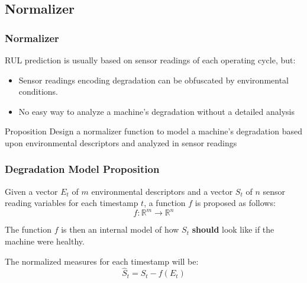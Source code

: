 \documentclass{beamer}
\begin{document}
        \subsection{Normalizer}

            \begin{frame}
                \frametitle{Normalizer}
                RUL prediction is usually based on sensor readings of each operating cycle, but:
                \begin{itemize}
                    \item Sensor readings encoding degradation can be obfuscated by environmental conditions.
                    \item No easy way to analyze a machine's degradation without a detailed analysis
                \end{itemize}
                \begin{block}{Proposition}
                    Design a normalizer function to model a machine's degradation based upon environmental descriptors and analyzed in sensor readings
                \end{block}
            \end{frame}

            \begin{frame}
                \frametitle{Degradation Model Proposition}
                Given a vector $E_t$ of $m$ environmental descriptors and a vector $S_t$ of $n$ sensor reading variables for each timestamp $t$, a function $f$ is proposed as follows:
                \begin{equation}
                    f: \mathbb{R}^m \rightarrow \mathbb{R}^n
                \end{equation}

                The function $f$ is then an internal model of how $S_t$ \textbf{should} look like if the machine were healthy.

                The normalized measures for each timestamp will be:
                \begin{equation}
                    \hat{S}_t = S_t - f(E_t)
                \end{equation}
            \end{frame}
\end{document}

